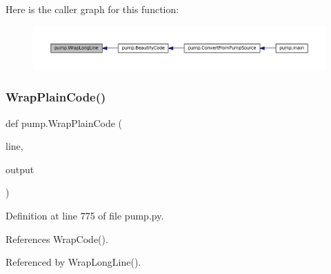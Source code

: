 Here is the caller graph for this function\+:
\nopagebreak
\begin{figure}[H]
\begin{center}
\leavevmode
\includegraphics[width=350pt]{namespacepump_a02427e2ddc80f0f408e27dfc3e38e702_icgraph}
\end{center}
\end{figure}
\mbox{\label{namespacepump_a60723738cc38d8ced7e2cfecc72d8b11}} 
\subsubsection{\texorpdfstring{Wrap\+Plain\+Code()}{WrapPlainCode()}}
{\footnotesize\ttfamily def pump.\+Wrap\+Plain\+Code (\begin{DoxyParamCaption}\item[{}]{line,  }\item[{}]{output }\end{DoxyParamCaption})}



Definition at line 775 of file pump.\+py.



References Wrap\+Code().



Referenced by Wrap\+Long\+Line().



